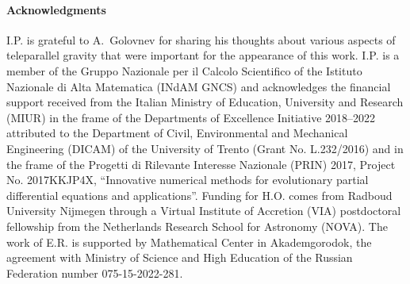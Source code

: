 \documentclass[
10pt, %
a4paper, %
oneside, %
headinclude,footinclude, %
BCOR5mm, %
]{scrartcl}
\begin{document}
\paragraph{Acknowledgments}
I.P. is grateful to A.~Golovnev for sharing his thoughts about various aspects of teleparallel 
gravity that were important for the appearance of this work.
I.P. is a member of the Gruppo Nazionale per il Calcolo Scientifico of the Istituto Nazionale di 
Alta Matematica (INdAM GNCS) and acknowledges the financial support received from the Italian 
Ministry of Education, University and Research (MIUR) in the frame of the Departments of Excellence 
Initiative 2018–2022 attributed to the Department of Civil, Environmental and Mechanical 
Engineering (DICAM) of the University of Trento (Grant No. L.232/2016) and in the frame of the 
Progetti di Rilevante Interesse Nazionale (PRIN) 2017, Project No. 2017KKJP4X, “Innovative numerical
methods for evolutionary partial differential equations and applications”.
%
Funding for H.O. comes from Radboud University Nijmegen through a Virtual Institute of Accretion 
(VIA) postdoctoral fellowship from the Netherlands Research School for Astronomy (NOVA).
%
The work of E.R. is supported by Mathematical
Center in Akademgorodok, the agreement with Ministry of Science and High Education
of the Russian Federation number 075-15-2022-281.


\appendix
\end{document}

